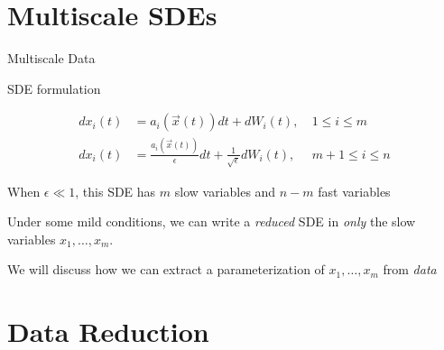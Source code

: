 \documentclass[12pt]{beamer}
\begin{document}
%
%


\section{Multiscale SDEs}

\begin{frame}{Multiscale Data}

\begin{block}{SDE formulation}

\begin{equation*}
\begin{aligned}
dx_i(t) &= a_i(\vec{x}(t)) dt + dW_i(t), & \: 1 \le i \le m \\
dx_i(t) &= \frac{a_i(\vec{x}(t))}{\epsilon} dt + \frac{1}{\sqrt{\epsilon}} dW_i(t) , & \: m+1 \le i \le n
\end{aligned}
\end{equation*}
\end{block}

When $\epsilon \ll 1$, this SDE has $m$ slow variables and $n-m$ fast variables

Under some mild conditions, we can write a {\em reduced} SDE in {\em only} the slow variables $x_1, \dots, x_m$.

We will discuss how we can extract a parameterization of $x_1, \dots, x_m$ from {\em data}

\end{frame}

\section{Data Reduction}
\end{document}
